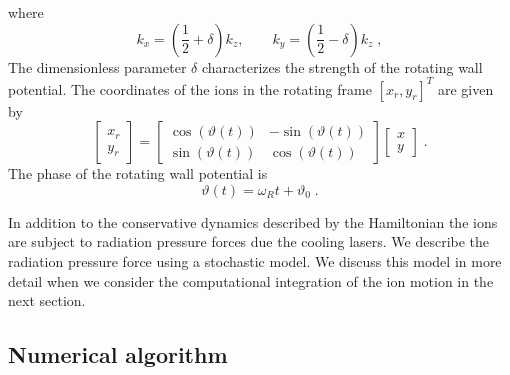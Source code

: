 \documentclass[aps, pra, preprint]{revtex4-1}
\begin{document}
where
\begin{equation}
k_x=\left(\frac{1}{2}+\delta\right)k_z,\qquad 
k_y=\left(\frac{1}{2}-\delta\right)k_z\;,
\end{equation}
The dimensionless parameter $\delta$ characterizes the strength
of the rotating wall potential. The coordinates of the ions in
the rotating frame $[x_r, y_r]^T$ are given by
\begin{equation}
\left[
\begin{array}{c}
x_r\\
y_r
\end{array}\right] =
\left[
\begin{array}{cc}
\cos(\vartheta(t)) & -\sin(\vartheta(t))\\
\sin(\vartheta(t)) & \cos(\vartheta(t))
\end{array}\right]
\left[\begin{array}{c}
x\\
y
\end{array}\right]\;.
\end{equation}
The phase of the rotating wall potential is
\begin{equation}
\vartheta(t)=\omega_R t+\vartheta_0\;.
\end{equation}

In addition to the conservative dynamics described by the
Hamiltonian the ions are subject to radiation pressure forces due
the cooling lasers. We describe the radiation pressure force
using a stochastic model. We discuss this model in more detail
when we consider the computational integration of the ion motion
in the next section.


\subsection{Numerical algorithm}
\end{document}
